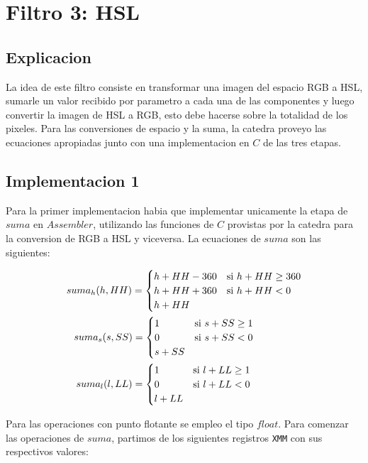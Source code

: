 \section{Filtro 3: HSL}

\subsection{Explicacion}

La idea de este filtro consiste en transformar una imagen del espacio RGB a HSL, sumarle un valor recibido por parametro a cada una de las componentes y luego convertir la imagen de HSL a RGB, esto debe hacerse sobre la totalidad de los pixeles. Para las conversiones de espacio y la suma, la catedra proveyo las ecuaciones apropiadas junto con una implementacion en $C$ de las tres etapas.

\subsection{Implementacion 1}

Para la primer implementacion habia que implementar unicamente la etapa de $suma$ en $Assembler$, utilizando las funciones de $C$ provistas por la catedra para la conversion de RGB a HSL y viceversa. La ecuaciones de $suma$ son las siguientes:

\begin{align*}
suma_h(h, HH) =
\begin{cases}
h + HH - 360 &\mbox{si}\ h + HH \geq 360\\
h + HH + 360 &\mbox{si}\ h + HH < 0     \\
h + HH
\end{cases}
\\
suma_s(s, SS) =
\begin{cases}
1 &\mbox{si}\ s + SS \geq 1\hspace{17mm}\\
0 &\mbox{si}\ s + SS < 0   \\
s + SS
\end{cases}
\\
suma_l(l, LL) =
\begin{cases}
1 &\mbox{si}\ l + LL \geq 1\hspace{18mm}\\
0 &\mbox{si}\ l + LL < 0   \\
l + LL
\end{cases}
\end{align*}

Para las operaciones con punto flotante se empleo el tipo $float$. Para comenzar las operaciones de $suma$, partimos de los siguientes registros \texttt{XMM} con sus respectivos valores:\\

